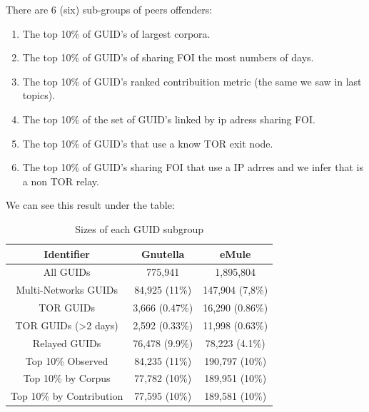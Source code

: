 \documentclass[notes]{beamer}
\begin{document}
\begin{frame}

\begin{block}{There are 6 (six) sub-groups of peers offenders:}

\begin{enumerate}

\item The top 10\% of GUID’s of largest corpora.

\item The top 10\% of GUID’s of sharing FOI the most numbers of days.

\item The top 10\% of GUID’s ranked contribuition metric (the same we saw in last topics).

\item The top 10\% of the set of GUID’s linked by ip adress sharing FOI.

\item The top 10\% of GUID’s that use a know TOR exit node.

\item The top 10\% of GUID’s  sharing FOI that use a IP adrres and we infer that is a non TOR relay.

\end{enumerate}

\end{block}

\end{frame}

\begin{frame}
\begin{block}{We can see this  result under the table:}

\begin{table} 

\centering

\caption{Sizes of each GUID subgroup} 

\begin{tabular}{ccc}

\hline 

Identifier & Gnutella & eMule \\ 

\hline
\hline
All GUIDs & 775,941 & 1,895,804 \\
Multi-Networks GUIDs & 84,925 (11\%) & 147,904 (7,8\%) \\
TOR GUIDs & 3,666 (0.47\%) & 16,290 (0.86\%) \\
TOR GUIDs (>2 days) & 2,592 (0.33\%) & 11,998 (0.63\%) \\
Relayed GUIDs & 76,478 (9.9\%) & 78,223 (4.1\%) \\
Top 10\% Observed & 84,235 (11\%) & 190,797 (10\%) \\
Top 10\% by Corpus & 77,782 (10\%) & 189,951 (10\%) \\
Top 10\% by Contribution & 77,595 (10\%) & 189,581 (10\%)\\

\hline
\end{tabular}
\label{table2}
\end{table} 

\end{block}

\end{frame}
\end{document}
